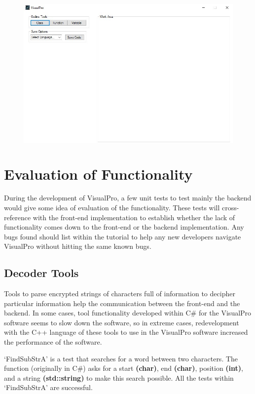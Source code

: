 \documentclass[12pt]{report} %
\begin{document}
			\begin{figure}[H]
				{\includegraphics[scale=0.65]{Figures/vp-designs/Final.jpg}}
			\end{figure}
		
	\chapter{Evaluation of Functionality}
		During the development of VisualPro, a few unit tests to test mainly the backend would give some idea of evaluation of the functionality. These tests will cross-reference with the front-end implementation to establish whether the lack of functionality comes down to the front-end or the backend implementation. Any bugs found should list within the tutorial to help any new developers navigate VisualPro without hitting the same known bugs.

		\section{Decoder Tools}
			Tools to parse encrypted strings of characters full of information to decipher particular information help the communication between the front-end and the backend. In some cases, tool functionality developed within C\# for the VisualPro software seems to slow down the software, so in extreme cases, redevelopment with the C++ language of these tools to use in the VisualPro software increased the performance of the software.

			`FindSubStrA' is a test that searches for a word between two characters. The function (originally in C\#) asks for a start \textbf{(char)}, end \textbf{(char)}, position \textbf{(int)}, and a string \textbf{(std::string)} to make this search possible. All the tests within `FindSubStrA' are successful.
\end{document}
